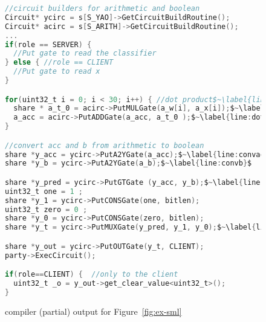 \begin{figure}
\begin{lstlisting}[language=C, mathescape=true]
//circuit builders for arithmetic and boolean
Circuit* ycirc = s[S_YAO]->GetCircuitBuildRoutine();
Circuit* acirc = s[S_ARITH]->GetCircuitBuildRoutine();
...
if(role == SERVER) { 
  //Put gate to read the classifier
} else { //role == CLIENT
  //Put gate to read x
}

for(uint32_t i = 0; i < 30; i++) { //dot product$~\label{line:dotproductloop}$
  share * a_t_0 = acirc->PutMULGate(a_w[i], a_x[i]);$~\label{line:dotmulgate}$
  a_acc = acirc->PutADDGate(a_acc, a_t_0 );$~\label{line:dotaddgate}$
}

//convert acc and b from arithmetic to boolean
share *y_acc = ycirc->PutA2YGate(a_acc);$~\label{line:convacc}$
share *y_b = ycirc->PutA2YGate(a_b);$~\label{line:convb}$

share *y_pred = ycirc->PutGTGate (y_acc, y_b);$~\label{line:condyaobegin}$
uint32_t one = 1 ;
share *y_1 = ycirc->PutCONSGate(one, bitlen);
uint32_t zero = 0 ;
share *y_0 = ycirc->PutCONSGate(zero, bitlen);
share *y_t = ycirc->PutMUXGate(y_pred, y_1, y_0);$~\label{line:condyaoend}$

share *y_out = ycirc->PutOUTGate(y_t, CLIENT);
party->ExecCircuit();

if(role==CLIENT) {  //only to the client
  uint32_t _o = y_out->get_clear_value<uint32_t>();
}
\end{lstlisting}
\caption{\tool compiler (partial) output for Figure~\ref{fig:ex-sml}}
\label{fig:ex-aby}
\end{figure}
